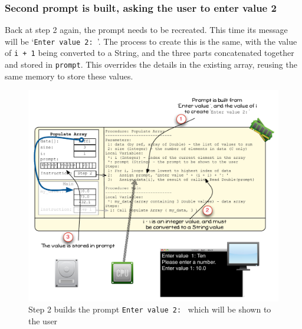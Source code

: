 
\clearpage
\subsubsection{Second prompt is built, asking the user to enter value 2} %
\label{ssub:second_prompt_is_built_asking_the_user_to_enter_value_2}

Back at step 2 again, the prompt needs to be recreated. This time its message will be `\texttt{Enter value 2: }'. The process to create this is the same, with the value of \texttt{i + 1} being converted to a String, and the three parts concatenated together and stored in \texttt{prompt}. This overrides the details in the existing array, reusing the same memory to store these values.

\begin{figure}[htbp]
   \centering
   \includegraphics[width=\textwidth]{./topics/arrays/images/PopulateArray7} 
   \caption{Step 2 builds the prompt \texttt{Enter value 2: } which will be shown to the user}
   \label{fig:populate-array-vis-7}
\end{figure}

